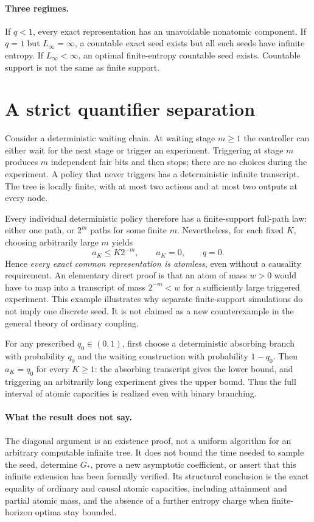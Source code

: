 \documentclass[11pt]{article}
\begin{document}
\paragraph{Three regimes.}
If $q<1$, every exact representation has an unavoidable nonatomic
component. If $q=1$ but $L_\infty=\infty$, a countable exact seed exists
but all such seeds have infinite entropy. If $L_\infty<\infty$, an
optimal finite-entropy countable seed exists. Countable support is not
the same as finite support.

\section{A strict quantifier separation}
Consider a deterministic waiting chain. At waiting stage $m\ge1$ the
controller can either wait for the next stage or trigger an experiment.
Triggering at stage $m$ produces $m$ independent fair bits and then
stops; there are no choices during the experiment. A policy that never
triggers has a deterministic infinite transcript. The tree is locally
finite, with at most two actions and at most two outputs at every node.

Every individual deterministic policy therefore has a finite-support
full-path law: either one path, or $2^m$ paths for some finite $m$.
Nevertheless, for each fixed $K$, choosing arbitrarily large $m$ yields
\[
 a_K\le K2^{-m},\qquad a_K=0,\qquad q=0.
\]
Hence \emph{every exact common representation is atomless}, even
without a causality requirement. An elementary direct proof is that
an atom of mass $w>0$ would have to map into a transcript of mass
$2^{-m}<w$ for a sufficiently large triggered experiment.
This example illustrates why separate finite-support simulations do
not imply one discrete seed. It is not claimed as a new counterexample
in the general theory of ordinary coupling.

For any prescribed $q_0\in(0,1)$, first choose a deterministic absorbing
branch with probability $q_0$ and the waiting construction with
probability $1-q_0$. Then $a_K=q_0$ for every $K\ge1$: the absorbing
transcript gives the lower bound, and triggering an arbitrarily long
experiment gives the upper bound. Thus the full interval of atomic
capacities is realized even with binary branching.

\paragraph{What the result does not say.}
The diagonal argument is an existence proof, not a uniform algorithm
for an arbitrary computable infinite tree. It does not bound the time
needed to sample the seed, determine $G_*$, prove a new asymptotic
coefficient, or assert that this infinite extension has been formally
verified. Its structural conclusion is the exact equality of ordinary
and causal atomic capacities, including attainment and partial atomic
mass, and the absence of a further entropy charge when finite-horizon
optima stay bounded.
\end{document}
